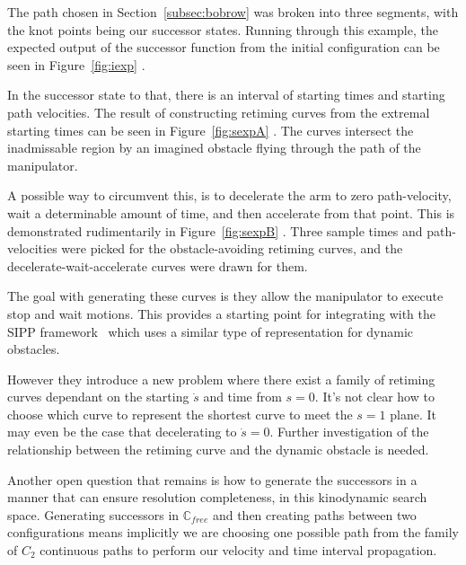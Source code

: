 \documentclass[letterpaper,11pt]{article} %
\newcommand{\ffigdoublevert}[4]{
\begin{figure}[h!]
\centering

\begin{subfigure}[t!]{0.9\linewidth}
\texttt{[image: \#1]}
\caption{}
\label{fig:#4L}
\end{subfigure}
~
\begin{subfigure}[b!]{0.9\linewidth}
\texttt{[image: \#2]}
\caption{}
\label{fig:#4R}
\end{subfigure}

\caption{#3}
\label{fig:#4}
\end{figure}
}
\newif\ifpfig
\newcommand{\reffig}[1]
{
Figure~\ref{fig:#1}
}
\begin{document}
The path chosen in Section~\ref{subsec:bobrow} was broken into three segments, with the knot points being our successor states. Running through this example, the expected output of the successor function from the initial configuration can be seen in \reffig{iexp}.

\ifpfig
\ffigdoublevert{pics/planner/initial_exp1}{pics/planner/initial_exp2}{Successor reachable velocities and time interval generated for the start state, represented as the black line on the $s=1$ plane.}{iexp}

\ffigdoublevert{pics/planner/second_exp1}{pics/planner/second_exp2}{Possible retiming curves for the earliest and latest times for the \textbf{previous} state, represented as magenta and blue curves that start from the $s=0$ plane.}{sexpA}

\ffigdoublevert{pics/planner/second_exp4}{pics/planner/second_exp5}{Family of retiming curves that each start from a point on the $s=0$ plane decided by the preceding state.}{sexpB}
\fi

In the successor state to that, there is an interval of starting times and starting path velocities. The result of constructing retiming curves from the extremal starting times can be seen in \reffig{sexpA}. The curves intersect the inadmissable region by an imagined obstacle flying through the path of the manipulator.

A possible way to circumvent this, is to decelerate the arm to zero path-velocity, wait a determinable amount of time, and then accelerate from that point. This is demonstrated rudimentarily in\reffig{sexpB}. Three sample times and path-velocities were picked for the obstacle-avoiding retiming curves, and the decelerate-wait-accelerate curves were drawn for them.

The goal with generating these curves is they allow the manipulator to execute stop and wait motions. This provides a starting point for integrating with the SIPP framework~\cite{phillips2011sipp} which uses a similar type of representation for dynamic obstacles.

However they introduce a new problem where there exist a family of retiming curves dependant on the starting $\dot{s}$ and time from $s=0$. It's not clear how to choose which curve to represent the shortest curve to meet the $s=1$ plane. It may even be the case that decelerating to $\dot{s}=0$. Further investigation of the relationship between the retiming curve and the dynamic obstacle is needed.

Another open question that remains is how to generate the successors in a manner that can ensure resolution completeness, in this kinodynamic search space. Generating successors in $\mathbb{C}_{free}$ and then creating paths between two configurations means implicitly we are choosing one possible path from the family of $C_2$ continuous paths to perform our velocity and time interval propagation.
\end{document}
